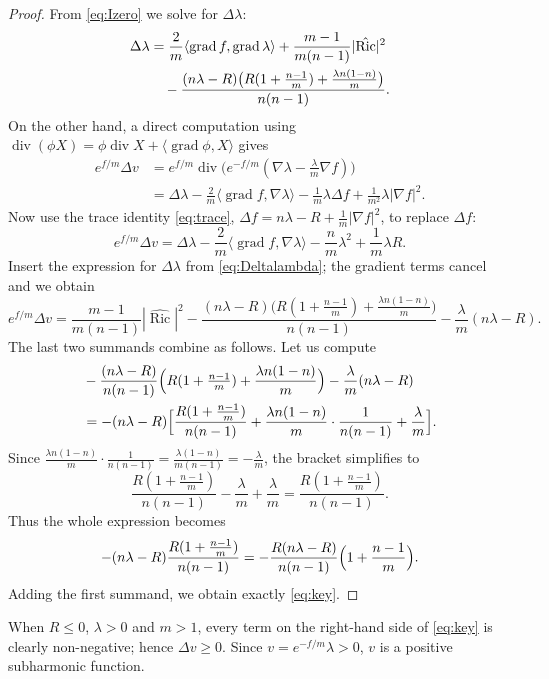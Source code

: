 \documentclass[10pt,a4paper]{amsart}
\newcommand{\Ric}{\operatorname{Ric}}
\newcommand{\grad}{\operatorname{grad}}
\newcommand{\divg}{\operatorname{div}}
\begin{document}
\begin{proof}
From \eqref{eq:Izero} we solve for $\Delta\lambda$:
\begin{align}
\Delta\lambda &= \frac{2}{m}\langle\grad f,\grad\lambda\rangle
+ \frac{m-1}{m(n-1)}|\hat{\Ric}|^2 \notag\\
&\quad - \frac{(n\lambda-R)\bigl(R(1+\frac{n-1}{m}) + \frac{\lambda n(1-n)}{m}\bigr)}{n(n-1)}. \label{eq:Deltalambda}
\end{align}
On the other hand, a direct computation using $\divg(\phi X)=\phi\divg X+\langle\grad\phi,X\rangle$ gives
\begin{align*}
e^{f/m}\Delta v &= e^{f/m}\divg\bigl( e^{-f/m}(\nabla\lambda - \tfrac{\lambda}{m}\nabla f) \bigr)\\
&= \Delta\lambda - \frac{2}{m}\langle\grad f,\nabla\lambda\rangle
- \frac{1}{m}\lambda\Delta f + \frac{1}{m^2}\lambda|\nabla f|^2.
\end{align*}
Now use the trace identity \eqref{eq:trace}, $\Delta f = n\lambda - R + \frac{1}{m}|\nabla f|^2$, to replace $\Delta f$:
\[
e^{f/m}\Delta v = \Delta\lambda - \frac{2}{m}\langle\grad f,\nabla\lambda\rangle
- \frac{n}{m}\lambda^2 + \frac{1}{m}\lambda R.
\]
Insert the expression for $\Delta\lambda$ from \eqref{eq:Deltalambda}; the gradient terms cancel and we obtain
\[
e^{f/m}\Delta v = \frac{m-1}{m(n-1)}|\hat{\Ric}|^2
- \frac{(n\lambda-R)\bigl(R(1+\frac{n-1}{m}) + \frac{\lambda n(1-n)}{m}\bigr)}{n(n-1)}
- \frac{\lambda}{m}(n\lambda-R).
\]
The last two summands combine as follows.
Let us compute
\begin{align*}
&-\frac{(n\lambda-R)}{n(n-1)}\Bigl(R(1+\tfrac{n-1}{m}) + \frac{\lambda n(1-n)}{m}\Bigr) - \frac{\lambda}{m}(n\lambda-R)\\
&= -(n\lambda-R)\Bigl[ \frac{R(1+\frac{n-1}{m})}{n(n-1)} + \frac{\lambda n(1-n)}{m}\cdot\frac{1}{n(n-1)} + \frac{\lambda}{m} \Bigr].
\end{align*}
Since $\frac{\lambda n(1-n)}{m}\cdot\frac{1}{n(n-1)} = \frac{\lambda(1-n)}{m(n-1)} = -\frac{\lambda}{m}$, the bracket simplifies to
\[
\frac{R(1+\frac{n-1}{m})}{n(n-1)} - \frac{\lambda}{m} + \frac{\lambda}{m}
= \frac{R(1+\frac{n-1}{m})}{n(n-1)}.
\]
Thus the whole expression becomes
\[
-(n\lambda-R)\frac{R(1+\frac{n-1}{m})}{n(n-1)}
= -\frac{R(n\lambda-R)}{n(n-1)}\Bigl(1+\frac{n-1}{m}\Bigr).
\]
Adding the first summand, we obtain exactly \eqref{eq:key}.
\end{proof}

When $R\le 0$, $\lambda>0$ and $m>1$, every term on the right-hand side of \eqref{eq:key} is clearly non-negative; hence $\Delta v\ge 0$.
Since $v=e^{-f/m}\lambda>0$, $v$ is a positive subharmonic function.
\end{document}
